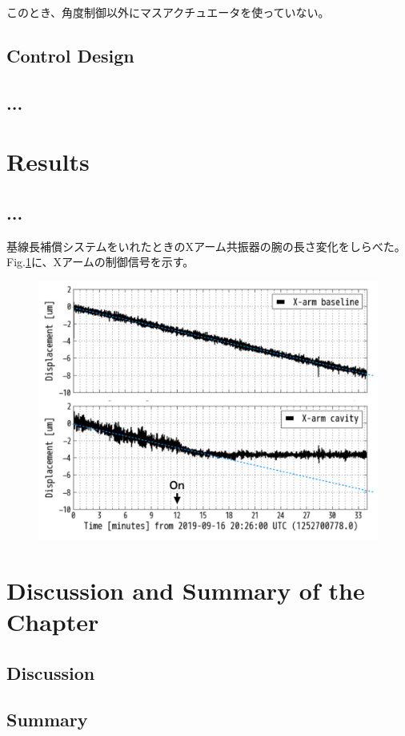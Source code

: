 このとき、角度制御以外にマスアクチュエータを使っていない。


\subsection{Control Design}


\subsection{...}


\section{Results}
\subsection{...}
基線長補償システムをいれたときのXアーム共振器の腕の長さ変化をしらべた。Fig.\ref{img:img610}に、Xアームの制御信号を示す。




\begin{figure}[p]
  \begin{center}   
    \includegraphics[width=12cm]{./img_chap6/img610.png}
    \caption{}\label{img:img610}
  \end{center}
\end{figure}


\section{Discussion and Summary of the Chapter}
\subsection{Discussion}
\subsection{Summary}
